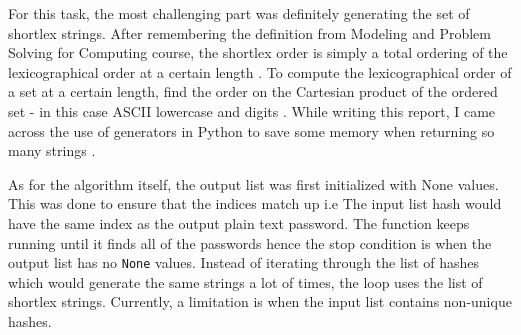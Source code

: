 For this task, the most challenging part was definitely generating the set of shortlex strings. After remembering the definition from Modeling and Problem Solving for Computing course, the shortlex order is simply a total ordering of the lexicographical order at a certain length \cite{wikipediaShortlexOrder}. To compute the lexicographical order of a set at a certain length, find the order on the Cartesian product of the ordered set - in this case ASCII lowercase and digits \cite{math24}. While writing this report, I came across the use of generators in Python to save some memory when returning so many strings \cite{python}.

As for the algorithm itself, the output list was first initialized with None values. This was done to ensure that the indices match up i.e The input list hash would have the same index as the output plain text password. The function keeps running until it finds all of the passwords hence the stop condition is when the output list has no \verb|None| values. Instead of iterating through the list of hashes which would generate the same strings a lot of times, the loop uses the list of shortlex strings. Currently, a limitation is when the input list contains non-unique hashes.
